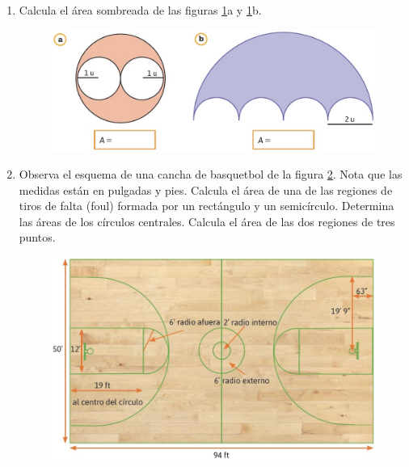 \documentclass[11pt]{book}
\begin{document}
\begin{enumerate}
        \newpage

  \item Calcula el área sombreada de las figuras \ref{fig:17.7}a y \ref{fig:17.7}b.
        \begin{figure}[H]
          \centering
          \includegraphics[width=\linewidth]{17.7.jpg}
          \label{fig:17.7}
        \end{figure}


  \item Observa el esquema de una cancha de basquetbol de la figura \ref{fig:17.8}. Nota que las medidas están en pulgadas y pies.
        Calcula el área de una de las regiones de tiros de falta (foul) formada por un rectángulo y un semicírculo.
        Determina las áreas de los círculos centrales.
        Calcula el área de las dos regiones de tres puntos.
        \begin{figure}[H]
          \centering
          \includegraphics[width=0.8\linewidth]{17.8.jpg}
          \label{fig:17.8}
        \end{figure}
\end{enumerate}
\end{document}
